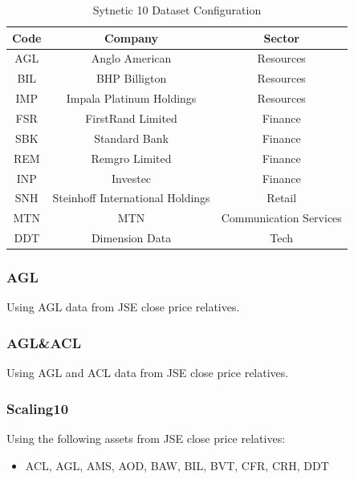 \documentclass[a4paper,11pt,oneside]{article}
\theoremstyle{plain}
\theoremstyle{definition}
\begin{document}
\begin{table}[H]
	\centering
	\begin{tabular}{|c|c|c|}
		\hline
		\textbf{Code} &\textbf{Company} & \textbf{Sector} \\\hline	
		{AGL} & {Anglo American} & {Resources}  \\\hline
		{BIL} & {BHP Billigton} & {Resources}  \\\hline
		{IMP} & {Impala Platinum Holdings} & {Resources}  \\\hline
		{FSR} & {FirstRand Limited} & {Finance}  \\\hline
		{SBK} & {Standard Bank} & {Finance}  \\\hline
		{REM} & {Remgro Limited} & {Finance}  \\\hline
		{INP} & {Investec} & {Finance}  \\\hline
		{SNH} & {Steinhoff International Holdings} & {Retail}    \\\hline
		{MTN} & {MTN} & {Communication Services}  \\\hline
		{DDT} & {Dimension Data} & {Tech} \\\hline
	\end{tabular}
	\newline\newline
	\caption{Sytnetic 10 Dataset Configuration}\label{tab_actual10}
\end{table}


\subsubsection{AGL}\label{dataset_agl}

Using AGL data from JSE close price relatives.

\subsubsection{AGL\&ACL}\label{dataset_aglacl}

Using AGL and ACL data from JSE close price relatives.

\subsubsection{Scaling10}\label{dataset_scaling10}

Using the following assets from JSE close price relatives:

\begin{itemize}
	\item ACL, AGL, AMS, AOD, BAW, BIL, BVT, CFR, CRH, DDT
\end{itemize}
\end{document}
